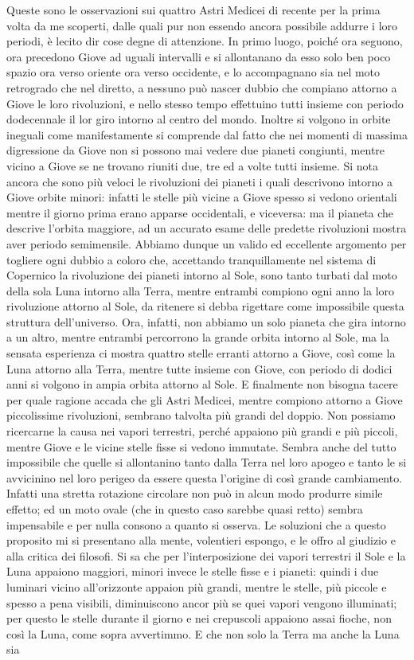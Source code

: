 \documentclass[11pt,twoside,openany]{book}
\begin{document}
Queste sono le osservazioni sui quattro Astri Medicei di recente per la prima volta da me scoperti, dalle quali pur non essendo ancora possibile addurre i loro periodi, è lecito dir cose degne di attenzione. In primo luogo, poiché ora seguono, ora precedono Giove ad uguali intervalli e si allontanano da esso solo ben poco spazio ora verso oriente ora verso occidente, e lo accompagnano sia nel moto retrogrado che nel diretto, a nessuno può nascer dubbio che compiano attorno a Giove le loro rivoluzioni, e nello stesso tempo effettuino tutti insieme con periodo dodecennale il lor giro intorno al centro del mondo. Inoltre si volgono in orbite ineguali come manifestamente si comprende dal fatto che nei momenti di massima digressione da Giove non si possono mai vedere due pianeti congiunti, mentre vicino a Giove se ne trovano riuniti due, tre ed a volte tutti insieme. Si nota ancora che sono più veloci le rivoluzioni dei pianeti i quali descrivono intorno a Giove orbite minori: infatti le stelle più vicine a Giove spesso si vedono orientali mentre il giorno prima erano apparse occidentali, e viceversa: ma il pianeta che descrive l'orbita maggiore, ad un accurato esame delle predette rivoluzioni mostra aver periodo semimensile. Abbiamo dunque un valido ed eccellente argomento per togliere ogni dubbio a coloro che, accettando tranquillamente nel sistema di Copernico la rivoluzione dei pianeti intorno al Sole, sono tanto turbati dal moto della sola Luna intorno alla Terra, mentre entrambi compiono ogni anno la loro rivoluzione attorno al Sole, da ritenere si debba rigettare come impossibile questa struttura dell'universo. Ora, infatti, non abbiamo un solo pianeta che gira intorno a un altro, mentre entrambi percorrono la grande orbita intorno al Sole, ma la sensata esperienza ci mostra quattro stelle erranti attorno a Giove, così come la Luna attorno alla Terra, mentre tutte insieme con Giove, con periodo di dodici anni si volgono in ampia orbita attorno al Sole. E finalmente non bisogna tacere per quale ragione accada che gli Astri Medicei, mentre compiono attorno a Giove piccolissime rivoluzioni, sembrano talvolta più grandi del doppio. Non possiamo ricercarne la causa nei vapori terrestri, perché appaiono più grandi e più piccoli, mentre Giove e le vicine stelle fisse si vedono immutate. Sembra anche del tutto impossibile che quelle si allontanino tanto dalla Terra nel loro apogeo e tanto le si avvicinino nel loro perigeo da essere questa l'origine di così grande cambiamento. Infatti una stretta rotazione circolare non può in alcun modo produrre simile effetto; ed un moto ovale (che in questo caso sarebbe quasi retto) sembra impensabile e per nulla consono a quanto si osserva. Le soluzioni che a questo proposito mi si presentano alla mente, volentieri espongo, e le offro al giudizio e alla critica dei filosofi. Si sa che per l'interposizione dei vapori terrestri il Sole e la Luna appaiono maggiori, minori invece le stelle fisse e i pianeti: quindi i due luminari vicino all'orizzonte appaion più grandi, mentre le stelle, più piccole e spesso a pena visibili, diminuiscono ancor più se quei vapori vengono illuminati; per questo le stelle durante il giorno e nei crepuscoli appaiono assai fioche, non così la Luna, come sopra avvertimmo. E che non solo la Terra ma anche la Luna sia 
\end{document}
